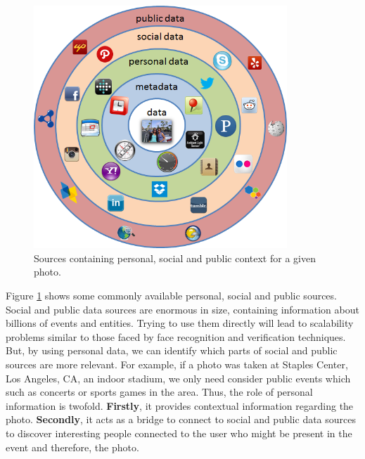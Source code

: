 \begin{figure}[h]
\centering
\includegraphics[width=0.85\textwidth]{media/chapter2/personal-social-public-data-sources.png}
\caption{Sources containing personal, social and public context for a given photo.}
\label{fig:personal-social-public-sources}
\end{figure}

Figure \ref{fig:personal-social-public-sources} shows some commonly available personal, social and public sources. Social and public data sources are enormous in size, containing information about billions of events and entities. Trying to use them directly will lead to scalability problems similar to those faced by face recognition and verification techniques. But, by using personal data, we can identify which parts of social and public sources are more relevant. For example, if a photo was taken at Staples Center, Los Angeles, CA, an indoor stadium, we only need consider public events which such as concerts or sports games in the area. Thus, the role of personal information is twofold. \textbf{Firstly}, it provides contextual information regarding the photo. \textbf{Secondly}, it acts as a bridge to connect to social and public data sources to discover interesting people connected to the user who might be present in the event and therefore, the photo.

